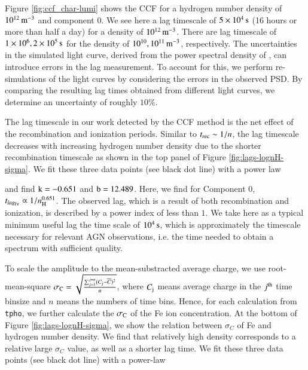 \documentclass{aa}
\begin{document}
Figure \ref{fig:ccf_char-lumi} shows the CCF for a hydrogen number density of $10^{12} \, \rm m^{-3}$ and component 0. 
We see here a lag timescale of $5 \times 10^{4} \, \rm s$ (16 hours or more than half a day) for a density of $\rm 10^{12} \, m^{-3}$.
There are lag timescale of $1 \times 10^{6}, 2 \times 10^{5} \, \rm s$ for the density of $10^{10}, 10^{11} \, \rm m^{-3}$, respectively. 
The uncertainties in the simulated light curve, derived from the power spectral density of \cite{Markowitz2005ApJ}, can introduce errors in the lag measurement. 
To account for this, we perform re-simulations of the light curves by considering the errors in the observed PSD. 
By comparing the resulting lag times obtained from different light curves, we determine an uncertainty of roughly $10\%$.

%

%



The lag timescale in our work detected by the CCF method is the net effect of the recombination and ionization periods.
Similar to $t_{\rm rec} \sim 1/n$, the lag timescale decreases with increasing hydrogen number density due to the shorter recombination timescale as shown in the top panel of Figure \ref{fig:lags-lognH-sigma}.
We fit these three data points (see black dot line) with a power law 

and find $\rm k = -0.651$ and $\rm b = 12.489$.
Here, we find for Component 0, $t_{lag_{\rm Fe}} \varpropto 1/n_{\rm H}^{0.651}$. 
The observed lag, which is a result of both recombination and ionization, is described by a power index of less than $1$.
We take here as a typical minimum useful lag the time scale of $\rm 10^4 \, s$, which is approximately the timescale necessary for relevant AGN observations, i.e. the time needed to obtain a spectrum with sufficient quality. 
%
%

%


To scale the amplitude to the mean-substracted average charge, we use root-mean-square \( \rm \sigma_C = \sqrt{\frac{ \sum_{j=1}^{j=n} (C_{\rm j} - \overline{C})^2}{n}} \), where
$ C_{\rm j}$ means average charge in the $ j^{\rm th}$ time binsize and $ n$ means the numbers of time bins.
Hence, for each calculation from \texttt{tpho}, we further calculate the $\rm \sigma_C$ of the Fe ion concentration.
At the bottom of Figure \ref{fig:lags-lognH-sigma}, we show the relation between $\sigma_{C}$ of Fe and hydrogen number density.
We find that relatively high density corresponds to a relative large $\sigma_C$ value, as well as a shorter lag time.
We fit these three data points (see black dot line) with a power-law 
\end{document}
